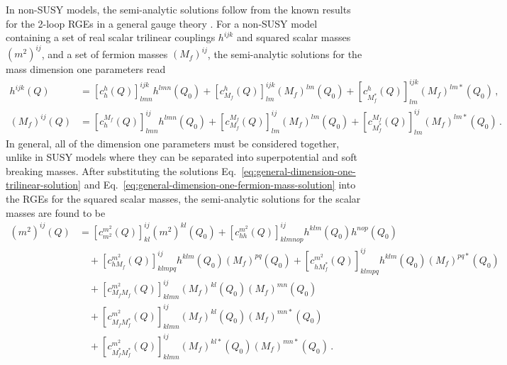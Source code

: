 \documentclass[final,3p,11pt,pdflatex]{elsarticle}
\newcommand{\scoeff}[2]{[ c^{#1}_{#2}(Q) ]}
\begin{document}
In non-SUSY models, the semi-analytic solutions follow from the known
results for the 2-loop RGEs in a general gauge theory \cite{Machacek:1983tz,
  Machacek:1983fi,Machacek:1984zw,Luo:2002ti,Fonseca:2013bua}.  For a non-SUSY
model containing a set of real scalar trilinear couplings $h^{ijk}$ and squared
scalar masses $(m^2)^{ij}$, and a set of fermion masses $(M_f)^{ij}$, the
semi-analytic solutions for the mass dimension one parameters read
\begin{align}
  h^{ijk}(Q) &= \scoeff{h}{h}^{ijk}_{lmn} h^{lmn}(Q_0)
  + \scoeff{h}{M_f}^{ijk}_{lm} (M_f)^{lm}(Q_0)
  + \scoeff{h}{M_f^*}^{ijk}_{lm} (M_f)^{lm*}(Q_0) \, ,
  \label{eq:general-dimension-one-trilinear-solution} \\
  (M_f)^{ij}(Q) &= \scoeff{M_f}{h}^{ij}_{lmn} h^{lmn}(Q_0)
  + \scoeff{M_f}{M_f}^{ij}_{lm} (M_f)^{lm}(Q_0)
  + \scoeff{M_f}{M_f^*}^{ij}_{lm} (M_f)^{lm*}(Q_0) \, .
  \label{eq:general-dimension-one-fermion-mass-solution}
\end{align}
In general, all of the dimension one parameters must be considered together,
unlike in SUSY models where they can be separated into superpotential and soft
breaking masses.  After substituting the solutions
Eq.~\eqref{eq:general-dimension-one-trilinear-solution} and
Eq.~\eqref{eq:general-dimension-one-fermion-mass-solution} into the RGEs for
the squared scalar masses, the semi-analytic solutions for the scalar masses
are found to be
\begin{align}
  (m^2)^{ij}(Q) &= \scoeff{m^2}{m^2}^{ij}_{kl} (m^2)^{kl}(Q_0)
  + \scoeff{m^2}{h h}^{ij}_{klmnop} h^{klm}(Q_0) h^{nop}(Q_0) \nonumber \\
  & \quad {} + \scoeff{m^2}{h M_f}^{ij}_{klmpq} h^{klm}(Q_0) (M_f)^{pq}(Q_0)
  + \scoeff{m^2}{h M_f^*}^{ij}_{klmpq} h^{klm}(Q_0) (M_f)^{pq*}(Q_0)
  \nonumber \\
  & \quad {} + \scoeff{m^2}{M_f M_f}^{ij}_{klmn} (M_f)^{kl}(Q_0) (M_f)^{mn}(Q_0)
  \nonumber \\
  & \quad {} + \scoeff{m^2}{M_f M_f^*}^{ij}_{klmn} (M_f)^{kl}(Q_0)
  (M_f)^{mn*}(Q_0) \nonumber \\
  & \quad {} + \scoeff{m^2}{M_f^* M_f^*}^{ij}_{klmn} (M_f)^{kl*}(Q_0)
  (M_f)^{mn*}(Q_0) \, .
  \label{eq:general-scalar-mass-solution}
\end{align}
\end{document}
